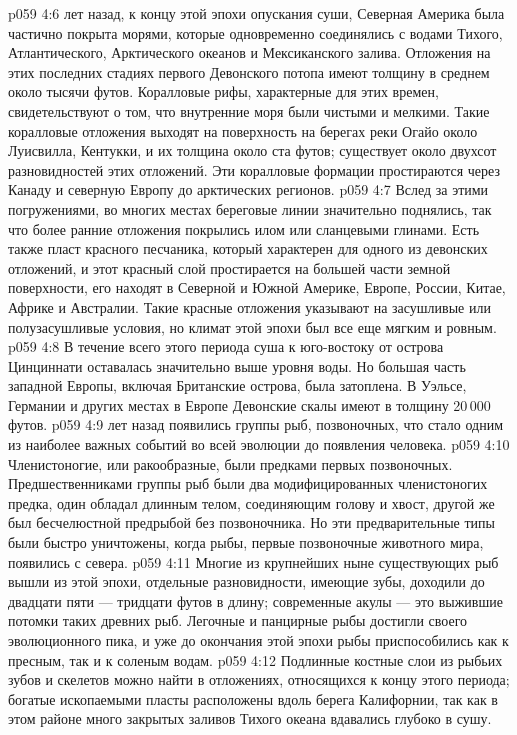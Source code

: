 \vs p059 4:6 \pc {} лет назад, к концу этой эпохи опускания суши, Северная Америка была частично покрыта морями, которые одновременно соединялись с водами Тихого, Атлантического, Арктического океанов и Мексиканского залива. Отложения на этих последних стадиях первого Девонского потопа имеют толщину в среднем около тысячи футов. Коралловые рифы, характерные для этих времен, свидетельствуют о том, что внутренние моря были чистыми и мелкими. Такие коралловые отложения выходят на поверхность на берегах реки Огайо около Луисвилла, Кентукки, и их толщина около ста футов; существует около двухсот разновидностей этих отложений. Эти коралловые формации простираются через Канаду и северную Европу до арктических регионов.
\vs p059 4:7 Вслед за этими погружениями, во многих местах береговые линии значительно поднялись, так что более ранние отложения покрылись илом или сланцевыми глинами. Есть также пласт красного песчаника, который характерен для одного из девонских отложений, и этот красный слой простирается на большей части земной поверхности, его находят в Северной и Южной Америке, Европе, России, Китае, Африке и Австралии. Такие красные отложения указывают на засушливые или полузасушливые условия, но климат этой эпохи был все еще мягким и ровным.
\vs p059 4:8 В течение всего этого периода суша к юго\hyp{}востоку от острова Цинциннати оставалась значительно выше уровня воды. Но большая часть западной Европы, включая Британские острова, была затоплена. В Уэльсе, Германии и других местах в Европе Девонские скалы имеют в толщину 20\,000 футов.
\vs p059 4:9 \pc {} лет назад появились группы рыб, позвоночных, что стало одним из наиболее важных событий во всей эволюции до появления человека.
\vs p059 4:10 Членистоногие, или ракообразные, были предками первых позвоночных. Предшественниками группы рыб были два модифицированных членистоногих предка, один обладал длинным телом, соединяющим голову и хвост, другой же был бесчелюстной предрыбой без позвоночника. Но эти предварительные типы были быстро уничтожены, когда рыбы, первые позвоночные животного мира,  появились с севера.
\vs p059 4:11 Многие из крупнейших ныне существующих рыб вышли из этой эпохи, отдельные разновидности, имеющие зубы, доходили до двадцати пяти --- тридцати футов в длину; современные акулы --- это выжившие потомки таких древних рыб. Легочные и панцирные рыбы достигли своего эволюционного пика, и уже до окончания этой эпохи рыбы приспособились как к пресным, так и к соленым водам.
\vs p059 4:12 Подлинные костные слои из рыбьих зубов и скелетов можно найти в отложениях, относящихся к концу этого периода; богатые ископаемыми пласты расположены вдоль берега Калифорнии, так как в этом районе много закрытых заливов Тихого океана вдавались глубоко в сушу.
